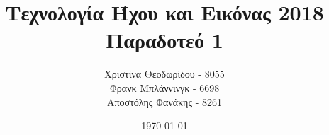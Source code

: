 \documentclass[11pt]{article}
\title{Τεχνολογία Ήχου και Εικόνας 2018\\
    Παραδοτεό 1}
\author{Χριστίνα Θεοδωρίδου - 8055\\
    Φρανκ Μπλάννινγκ - 6698\\
    Αποστόλης Φανάκης - 8261}
\date{\today}
\begin{document}
  {\titlefont \maketitle}
  
  

    
  
  
    


  \tableofcontents

  \newpage
  
  
  

  {}
  
\end{document}
